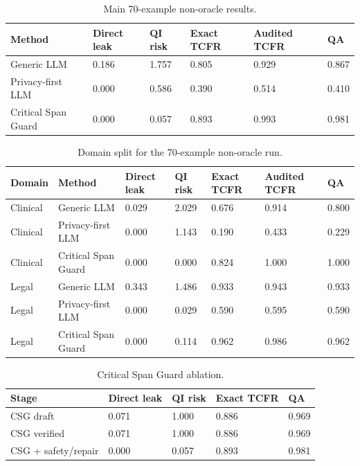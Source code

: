 \begin{table}[t]
\centering
\begin{tabular}{llllll}
\toprule
Method & Direct leak & QI risk & Exact TCFR & Audited TCFR & QA \\
\midrule
Generic LLM & 0.186 & 1.757 & 0.805 & 0.929 & 0.867 \\
Privacy-first LLM & 0.000 & 0.586 & 0.390 & 0.514 & 0.410 \\
Critical Span Guard & 0.000 & 0.057 & 0.893 & 0.993 & 0.981 \\
\bottomrule
\end{tabular}
\caption{Main 70-example non-oracle results.}
\end{table}

\begin{table}[t]
\centering
\begin{tabular}{lllllll}
\toprule
Domain & Method & Direct leak & QI risk & Exact TCFR & Audited TCFR & QA \\
\midrule
Clinical & Generic LLM & 0.029 & 2.029 & 0.676 & 0.914 & 0.800 \\
Clinical & Privacy-first LLM & 0.000 & 1.143 & 0.190 & 0.433 & 0.229 \\
Clinical & Critical Span Guard & 0.000 & 0.000 & 0.824 & 1.000 & 1.000 \\
Legal & Generic LLM & 0.343 & 1.486 & 0.933 & 0.943 & 0.933 \\
Legal & Privacy-first LLM & 0.000 & 0.029 & 0.590 & 0.595 & 0.590 \\
Legal & Critical Span Guard & 0.000 & 0.114 & 0.962 & 0.986 & 0.962 \\
\bottomrule
\end{tabular}
\caption{Domain split for the 70-example non-oracle run.}
\end{table}

\begin{table}[t]
\centering
\begin{tabular}{lllll}
\toprule
Stage & Direct leak & QI risk & Exact TCFR & QA \\
\midrule
CSG draft & 0.071 & 1.000 & 0.886 & 0.969 \\
CSG verified & 0.071 & 1.000 & 0.886 & 0.969 \\
CSG + safety/repair & 0.000 & 0.057 & 0.893 & 0.981 \\
\bottomrule
\end{tabular}
\caption{Critical Span Guard ablation.}
\end{table}

